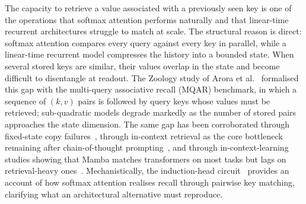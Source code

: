 The capacity to retrieve a value associated with a previously
seen key is one of the operations that softmax attention performs
naturally and that linear-time recurrent architectures struggle
to match at scale. The structural reason is direct: softmax
attention compares every query against every key in parallel,
while a linear-time recurrent model compresses the history into
a bounded state. When several stored keys are similar, their
values overlap in the state and become difficult to disentangle
at readout. The Zoology study of Arora et
al.~\cite{arora2023zoology} formalised this gap with the
multi-query associative recall (MQAR) benchmark, in which a
sequence of $(k, v)$ pairs is followed by query keys whose values
must be retrieved; sub-quadratic models degrade markedly as the
number of stored pairs approaches the state dimension. The same
gap has been corroborated through fixed-state copy
failures~\cite{jelassi2024repeat}, through in-context retrieval
as the core bottleneck remaining after chain-of-thought
prompting~\cite{wen2024rnns}, and through in-context-learning
studies showing that Mamba matches transformers on most tasks
but lags on retrieval-heavy
ones~\cite{park2024mamba,akyurek2024incontext}. Mechanistically,
the induction-head circuit~\cite{olsson2022induction} provides
an account of how softmax attention realises recall through
pairwise key matching, clarifying what an architectural
alternative must reproduce.

